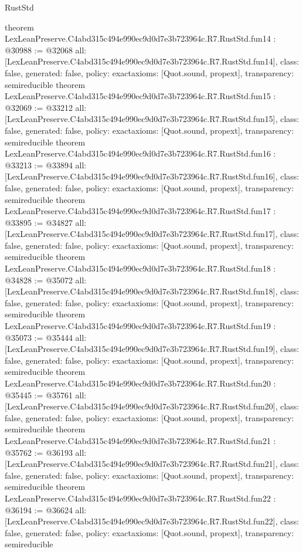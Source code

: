 \begin{lexlean}{RustStd}
\begin{coremodule}
{}
theorem LexLeanPreserve.C4abd315c494e990ec9d0d7e3b723964c.R7.RustStd.fun14 : @30988 := @32068 {
  all: [LexLeanPreserve.C4abd315c494e990ec9d0d7e3b723964c.R7.RustStd.fun14],
  class: false,
  generated: false,
  policy: exact{axioms: [Quot.sound, propext]},
  transparency: semireducible
}
theorem LexLeanPreserve.C4abd315c494e990ec9d0d7e3b723964c.R7.RustStd.fun15 : @32069 := @33212 {
  all: [LexLeanPreserve.C4abd315c494e990ec9d0d7e3b723964c.R7.RustStd.fun15],
  class: false,
  generated: false,
  policy: exact{axioms: [Quot.sound, propext]},
  transparency: semireducible
}
theorem LexLeanPreserve.C4abd315c494e990ec9d0d7e3b723964c.R7.RustStd.fun16 : @33213 := @33894 {
  all: [LexLeanPreserve.C4abd315c494e990ec9d0d7e3b723964c.R7.RustStd.fun16],
  class: false,
  generated: false,
  policy: exact{axioms: [Quot.sound, propext]},
  transparency: semireducible
}
theorem LexLeanPreserve.C4abd315c494e990ec9d0d7e3b723964c.R7.RustStd.fun17 : @33895 := @34827 {
  all: [LexLeanPreserve.C4abd315c494e990ec9d0d7e3b723964c.R7.RustStd.fun17],
  class: false,
  generated: false,
  policy: exact{axioms: [Quot.sound, propext]},
  transparency: semireducible
}
theorem LexLeanPreserve.C4abd315c494e990ec9d0d7e3b723964c.R7.RustStd.fun18 : @34828 := @35072 {
  all: [LexLeanPreserve.C4abd315c494e990ec9d0d7e3b723964c.R7.RustStd.fun18],
  class: false,
  generated: false,
  policy: exact{axioms: [Quot.sound, propext]},
  transparency: semireducible
}
theorem LexLeanPreserve.C4abd315c494e990ec9d0d7e3b723964c.R7.RustStd.fun19 : @35073 := @35444 {
  all: [LexLeanPreserve.C4abd315c494e990ec9d0d7e3b723964c.R7.RustStd.fun19],
  class: false,
  generated: false,
  policy: exact{axioms: [Quot.sound, propext]},
  transparency: semireducible
}
theorem LexLeanPreserve.C4abd315c494e990ec9d0d7e3b723964c.R7.RustStd.fun20 : @35445 := @35761 {
  all: [LexLeanPreserve.C4abd315c494e990ec9d0d7e3b723964c.R7.RustStd.fun20],
  class: false,
  generated: false,
  policy: exact{axioms: [Quot.sound, propext]},
  transparency: semireducible
}
theorem LexLeanPreserve.C4abd315c494e990ec9d0d7e3b723964c.R7.RustStd.fun21 : @35762 := @36193 {
  all: [LexLeanPreserve.C4abd315c494e990ec9d0d7e3b723964c.R7.RustStd.fun21],
  class: false,
  generated: false,
  policy: exact{axioms: [Quot.sound, propext]},
  transparency: semireducible
}
theorem LexLeanPreserve.C4abd315c494e990ec9d0d7e3b723964c.R7.RustStd.fun22 : @36194 := @36624 {
  all: [LexLeanPreserve.C4abd315c494e990ec9d0d7e3b723964c.R7.RustStd.fun22],
  class: false,
  generated: false,
  policy: exact{axioms: [Quot.sound, propext]},
  transparency: semireducible
}
\end{coremodule}
\end{lexlean}
